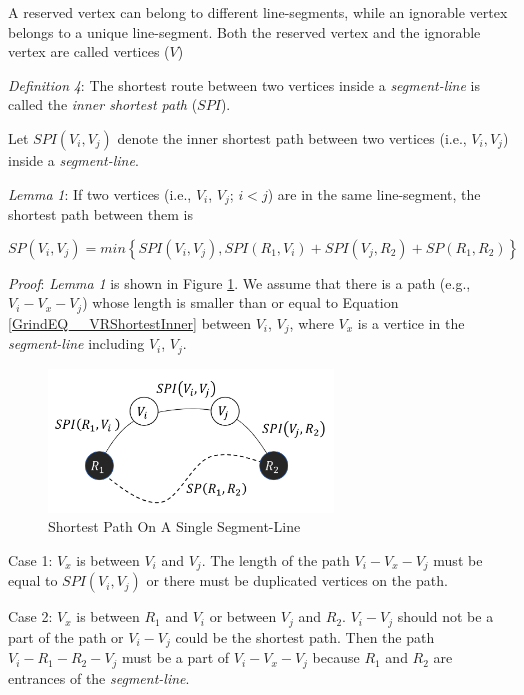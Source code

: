 A reserved vertex can belong to different line-segments, while an ignorable vertex belongs to a unique line-segment. Both the reserved vertex and the ignorable vertex are called vertices ($V$)\textit{}

\textit{Definition} \textit{4}: The shortest route between two vertices inside a \textit{segment-line} is called the \textit{inner shortest path} ($SPI$). 

Let ${SPI}\left(V_i,V_j\right)$ denote the inner shortest path between two vertices (i.e., $V_i,V_j$) inside a \textit{segment-line}.

\textit{Lemma} \textit{1}: If two vertices (i.e., $V_i$, $V_j$; $i<j$) are in the same line-segment, the shortest path between them is

\begin{equation} \label{GrindEQ__VRShortestInner} 
{SP}\left(V_i,V_j\right)={min}\left\{SPI\left(V_i,V_j\right),SPI\left(R_1,V_i\right)+SPI\left(V_j,R_2\right)+SP\left(R_1,R_2\right)\right\}
\end{equation}

\textit{Proof}: \textit{Lemma} \textit{1} is shown in Figure \ref{fig:ShortestPathOnASingleSegment}. We assume that there is a path (e.g., $V_i-V_x-V_j$) whose length is smaller than or equal to Equation \ref{GrindEQ__VRShortestInner} between $V_i$, $V_j$, where $V_x$ is a vertice in the \textit{segment-line} including $V_i$, $V_j$.

\begin{figure} [hbtp]
  \centering 
  \includegraphics[height=1.5in]{figures/ShortestPathOnASingleSegment.png}
  \caption{Shortest Path On A Single Segment-Line} 
  \label{fig:ShortestPathOnASingleSegment} %
\end{figure}

Case 1: $V_x$ is between $V_i$ and $V_j$. The length of the path $V_i-V_x-V_j$ must be equal to $SPI\left(V_i,V_j\right)$ or there must be duplicated vertices on the path.

Case 2: $V_x$ is between $R_1$ and $V_i$ or between $V_j$ and $R_2$. $V_i-V_j$ should not be a part of the path or $V_i-V_j$ could be the shortest path. Then the path $V_i-R_1-R_2-V_j$ must be a part of $V_i-V_x-V_j$ because $R_1$ and $R_2$ are entrances of the \textit{segment-line}.

